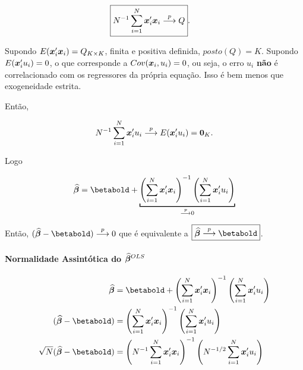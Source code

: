 \documentclass[11pt,oneside,a4paper]{article}
\numberwithin{equation}{section}
\begin{document}
\vspace{-1 em}
\begin{align} \label{eq:Q}
	\Aboxed{N^{-1} \sum_{i=1}^{N} \mbs{x}_{i}' \mbs{x}_{i} \arrowp Q }.
\end{align}

\noindent
Supondo $E(\boldsymbol{x}_{i}' \boldsymbol{x}_{i}) = Q_{K \times K}$, finita e positiva definida, $posto(Q) = K$.
Supondo $E(\boldsymbol{x}_{i}' u_{i}) = 0$, o que corresponde a $Cov(\boldsymbol{x}_{i}, u_{i}) = 0$, ou seja, o erro $u_{i}$ \textbf{não} é correlacionado com os regressores da própria equação.
Isso é bem menos que exogeneidade estrita.

Então, 

\vspace{-1 em}
\begin{align*}
	N^{-1} \sum_{i=1}^{N} \boldsymbol{x}_{i}' u_{i}  \overset{p}{\longrightarrow}  E(\boldsymbol{x}_{i}' u_{i}) = \boldsymbol{0}_{K}.
\end{align*}

Logo

\vspace{-1 em}
\begin{align*}
\betahatbold = 
\betabold +
\underbracket[1pt]{
\left( \sum_{i=1}^{N} \mbs{x}_{i}' \mbs{x}_{i} \right)^{-1}
\left( \sum_{i=1}^{N} \mbs{x}_{i}' u_{i} \right)}_{\arrowp 0}
\end{align*}

Então, 
$(\betahatbold - \betabold) \arrowp 0$ 
que é equivalente a 
$\boxed{\betahatbold \arrowp \betabold}$.

\paragraph{Normalidade Assintótica do $\widehat{\boldsymbol{\beta}}^{OLS}$}

\begin{align*}
\betahatbold 
&= 
\betabold +
\left( \sum_{i=1}^{N} \mbs{x}_{i}' \mbs{x}_{i} \right)^{-1}
\left( \sum_{i=1}^{N} \mbs{x}_{i}' u_{i} \right)
\\
(\betahatbold - \betabold)
&=
\left( \sum_{i=1}^{N} \mbs{x}_{i}' \mbs{x}_{i} \right)^{-1}
\left( \sum_{i=1}^{N} \mbs{x}_{i}' u_{i} \right)
\\
\sqrt{N} (\betahatbold - \betabold) &=
\left( N^{-1} \sum_{i=1}^{N} \mbs{x}_{i}' \mbs{x}_{i} \right)^{-1}
\left( N^{-1/2} \sum_{i=1}^{N} \mbs{x}_{i}' u_{i} \right)
\end{align*}
\end{document}
